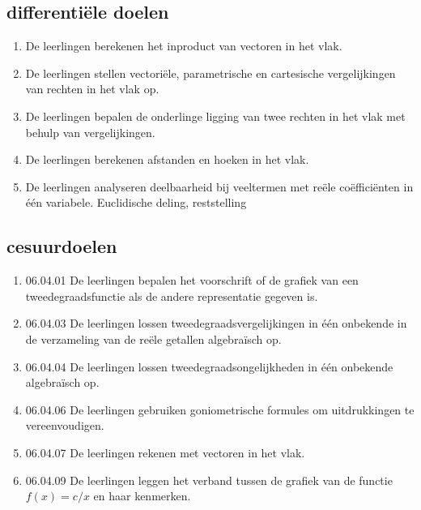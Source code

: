 \documentclass{article}
\begin{document}
\subsection{differentiële doelen}
\begin{enumerate}

    \item De leerlingen berekenen het inproduct van vectoren in het vlak.  
    
    \item De leerlingen stellen vectoriële, parametrische en cartesische vergelijkingen van rechten in het vlak op.
    
    \item De leerlingen bepalen de onderlinge ligging van twee rechten in het vlak met behulp van vergelijkingen.
    
    \item De leerlingen berekenen afstanden en hoeken in het vlak.
    
    \item De leerlingen analyseren deelbaarheid bij veeltermen met reële coëfficiënten in één variabele. Euclidische deling, reststelling
    
\end{enumerate}

\subsection{cesuurdoelen}

\begin{enumerate}

    
    \item 06.04.01 De leerlingen bepalen het voorschrift of de grafiek van een tweedegraadsfunctie als de andere representatie gegeven is.
    
    \item 06.04.03 De leerlingen lossen tweedegraadsvergelijkingen in één onbekende in de verzameling van de reële getallen algebraïsch op.
    
    \item 06.04.04 De leerlingen lossen tweedegraadsongelijkheden in één onbekende algebraïsch op.
    
    \item 06.04.06 De leerlingen gebruiken goniometrische formules om uitdrukkingen te vereenvoudigen.
    
    \item 06.04.07 De leerlingen rekenen met vectoren in het vlak.
    
    \item 06.04.09 De leerlingen leggen het verband tussen de grafiek van de functie \( f(x)=c/x \) en haar kenmerken.
    
\end{enumerate}
\end{document}
